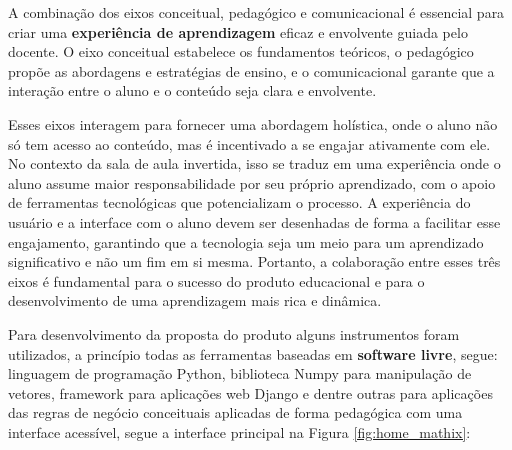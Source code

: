 A combinação dos eixos conceitual, pedagógico e comunicacional é essencial para criar uma \textbf{experiência de aprendizagem} eficaz e envolvente guiada pelo docente. O eixo conceitual estabelece os fundamentos teóricos, o pedagógico propõe as abordagens e estratégias de ensino, e o comunicacional garante que a interação entre o aluno e o conteúdo seja clara e envolvente.

Esses eixos interagem para fornecer uma abordagem holística, onde o aluno não só tem acesso ao conteúdo, mas é incentivado a se engajar ativamente com ele. No contexto da sala de aula invertida, isso se traduz em uma experiência onde o aluno assume maior responsabilidade por seu próprio aprendizado, com o apoio de ferramentas tecnológicas que potencializam o processo. A experiência do usuário e a interface com o aluno devem ser desenhadas de forma a facilitar esse engajamento, garantindo que a tecnologia seja um meio para um aprendizado significativo e não um fim em si mesma. Portanto, a colaboração entre esses três eixos é fundamental para o sucesso do produto educacional e para o desenvolvimento de uma aprendizagem mais rica e dinâmica.






Para desenvolvimento da proposta do produto alguns instrumentos foram utilizados, a princípio todas as ferramentas baseadas em \textbf{software livre}, segue: linguagem de programação Python, biblioteca Numpy para manipulação de vetores, framework para aplicações web Django e dentre outras para aplicações das regras de negócio conceituais aplicadas de forma pedagógica com uma interface acessível, segue a interface principal na Figura \ref{fig:home_mathix}:

